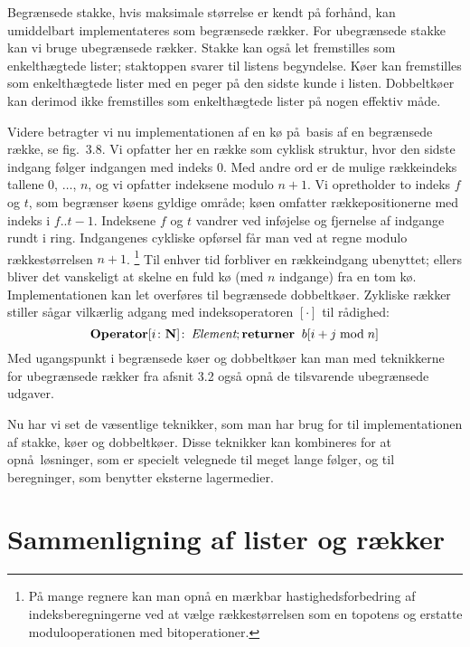 Begrænsede stakke, hvis maksimale størrelse er kendt på forhånd, kan umiddelbart implementateres som begrænsede rækker.
For ubegrænsede stakke kan vi bruge ubegrænsede rækker.
Stakke kan også let fremstilles som enkelthægtede lister; staktoppen svarer til listens begyndelse.
Køer kan fremstilles som enkelthægtede lister med en peger på den sidste kunde i listen.
Dobbeltkøer kan derimod ikke fremstilles som enkelthægtede lister på nogen effektiv måde.

Videre betragter vi nu implementationen af en kø på basis af en begrænsede række, se fig.~3.8.
Vi opfatter her en række som cyklisk struktur, hvor den sidste indgang følger indgangen med indeks 0.
Med andre ord er de mulige rækkeindeks tallene $0$, $\ldots$, $n$, og vi opfatter indeksene modulo $n+1$.
Vi opretholder to indeks $f$ og $t$, som begrænser køens gyldige område; køen omfatter rækkepositionerne med indeks i $f..t-1$.
Indeksene $f$ og $t$ vandrer ved inføjelse og fjernelse af indgange rundt i ring.
Indgangenes cykliske opførsel får man ved at regne modulo rækkestørrelsen $n+1$.%
\footnote{På mange regnere kan man opnå en mærkbar hastighedsforbedring af indeksberegningerne ved at vælge rækkestørrelsen som en topotens og erstatte modulooperationen med bitoperationer.}
Til enhver tid forbliver en rækkeindgang ubenyttet; ellers bliver det vanskeligt at skelne en fuld kø (med $n$ indgange) fra en tom kø.
Implementationen kan let overføres til begrænsede dobbeltkøer.
Zykliske rækker stiller sågar vilkærlig adgang med indeksoperatoren $[\cdot]$ til rådighed:
\[
  \operatorname{\textbf{Operator}} [i\colon\mathbf N] \colon
  \operatorname{\emph{Element}}; \operatorname{\textbf{returner~}} b[i+j\bmod n]
\]
Med ugangspunkt i begrænsede køer og dobbeltkøer kan man med teknikkerne for ubegrænsede rækker fra afsnit 3.2 også opnå de tilsvarende ubegrænsede udgaver.

Nu har vi set de væsentlige teknikker, som man har brug for til implementationen af stakke, køer og dobbeltkøer.
Disse teknikker kan kombineres for at opnå løsninger, som er specielt velegnede til meget lange følger, og til beregninger, som benytter eksterne lagermedier.

\begin{exerc}
\end{exerc}

\begin{exerc}
\end{exerc}

\section{Sammenligning af lister og rækker}

